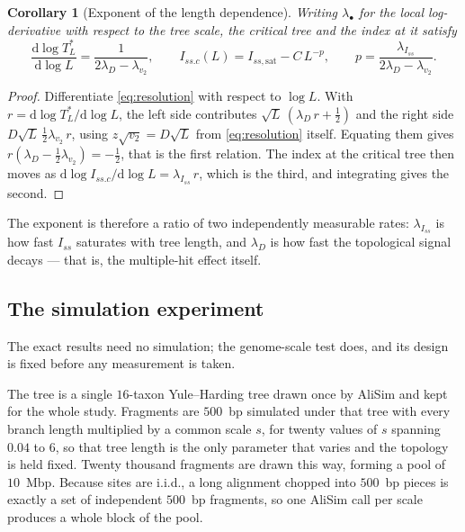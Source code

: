 \documentclass[preprint,12pt,authoryear]{elsarticle}
\newcommand{\Iss}{I_{ss}}
\newcommand{\Issc}{I_{ss.c}}
\newcommand{\Issat}{I_{ss,\mathrm{sat}}}
\newcommand{\TLstar}{T_L^{*}}
\newcommand{\lam}[1]{\lambda_{#1}}
\newtheorem{corollary}[theorem]{Corollary}
\theoremstyle{definition}
\theoremstyle{remark}
\begin{document}
\begin{corollary}[Exponent of the length dependence]
\label{cor:exponent}
Writing $\lam{\bullet}$ for the local log-derivative with respect to the tree
scale, the critical tree and the index at it satisfy
\begin{equation}
\frac{\mathrm d\log \TLstar}{\mathrm d\log L}
=\frac{1}{2\lam D-\lam{v_2}},
\qquad
\Issc(L)=\Issat-C\,L^{-p},
\qquad
p=\frac{\lam{\Iss}}{2\lam D-\lam{v_2}} .
\label{eq:exponent}
\end{equation}
\end{corollary}

\begin{proof}
Differentiate \eqref{eq:resolution} with respect to $\log L$. With
$r=\mathrm d\log\TLstar/\mathrm d\log L$, the left side contributes
$\sqrt L\,(\lam D\,r+\tfrac12)$ and the right side
$D\sqrt L\,\tfrac12\lam{v_2}\,r$, using $z\sqrt{v_2}=D\sqrt L$ from
\eqref{eq:resolution} itself. Equating them gives
$r(\lam D-\tfrac12\lam{v_2})=-\tfrac12$, that is the first relation. The
index at the critical tree then moves as
$\mathrm d\log\Issc/\mathrm d\log L=\lam{\Iss}\,r$, which is the third, and
integrating gives the second.
\end{proof}

The exponent is therefore a ratio of two independently measurable rates:
$\lam{\Iss}$ is how fast $\Iss$ saturates with tree length, and $\lam D$
is how fast the topological signal decays --- that is, the multiple-hit effect
itself.


\subsection{The simulation experiment}
\label{sec:design}

The exact results need no simulation; the genome-scale test does, and its
design is fixed before any measurement is taken.

The tree is a single $16$-taxon Yule--Harding tree drawn once by AliSim and
kept for the whole study. Fragments are $500$~bp simulated under that tree
with every branch length multiplied by a common scale $s$, for twenty values
of $s$ spanning $0.04$ to $6$, so that tree length is the only parameter that
varies and the topology is held fixed. Twenty thousand fragments are drawn
this way, forming a pool of $10$~Mbp. Because sites are i.i.d., a long
alignment chopped into $500$~bp pieces is exactly a set of independent
$500$~bp fragments, so one AliSim call per scale produces a whole block of
the pool.
\end{document}
